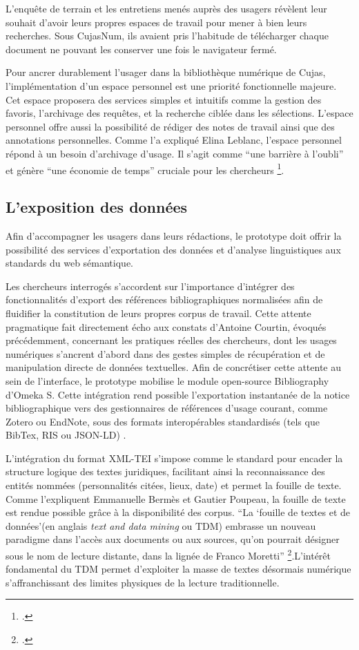 L'enquête de terrain et les entretiens menés auprès des usagers révèlent leur souhait d'avoir leurs propres espaces de  travail pour mener à bien leurs recherches. Sous CujasNum, ils avaient pris l'habitude de télécharger chaque document ne pouvant les conserver une fois le navigateur fermé.

Pour ancrer durablement l'usager dans la bibliothèque numérique de Cujas, l'implémentation d'un espace personnel est une priorité fonctionnelle majeure. Cet espace proposera des services simples et intuitifs comme la gestion des favoris, l'archivage des requêtes, et la recherche ciblée dans les sélections. L'espace personnel offre aussi la possibilité de rédiger des notes de travail ainsi que des annotations personnelles. Comme l'a expliqué Elina Leblanc, l'espace personnel répond à un besoin d'archivage d'usage. Il s'agit comme \enquote{une barrière à l'oubli} et génère \enquote{une économie de temps} cruciale pour les chercheurs \footcite{leblancBibliothequesNumeriquesEnrichies}.

\subsection{L'exposition des données}
Afin d'accompagner les usagers dans leurs rédactions, le prototype doit offrir la possibilité des services d'exportation des données et d'analyse linguistiques aux standards du web sémantique.

Les chercheurs interrogés s'accordent sur l'importance d'intégrer des fonctionnalités d'export des références bibliographiques normalisées afin de fluidifier la constitution de leurs propres corpus de travail. Cette attente pragmatique fait directement écho aux constats d'Antoine Courtin, évoqués précédemment, concernant les pratiques réelles des chercheurs, dont les usages numériques s'ancrent d'abord dans des gestes simples de récupération et de manipulation directe de données textuelles. Afin de concrétiser cette attente au sein de l'interface, le prototype mobilise le module open-source Bibliography d'Omeka S. Cette intégration rend possible l'exportation instantanée de la notice bibliographique vers des gestionnaires de références d'usage courant, comme Zotero ou EndNote, sous des formats interopérables standardisés (tels que BibTex, RIS ou JSON-LD) .

L'intégration du format \ac{XML-TEI} s'impose comme le standard pour encader la structure logique des textes juridiques, facilitant ainsi la reconnaissance des entités nommées (personnalités citées, lieux, date) et permet la fouille de texte. Comme l'expliquent Emmanuelle Bermès et Gautier Poupeau, la fouille de texte est rendue possible grâce à la disponibilité des corpus. \enquote{La \enquote{fouille de textes et de données}(en anglais \textit{text and data mining} ou \ac{TDM}) embrasse un nouveau paradigme dans l'accès aux documents ou aux sources, qu'on pourrait désigner sous le nom de lecture distante, dans la lignée de Franco Moretti} \footcite{bermesTroisAgesNumerique}.L'intérêt fondamental du \ac{TDM} permet d'exploiter la masse de textes désormais numérique s'affranchissant des limites physiques de la lecture traditionnelle.

